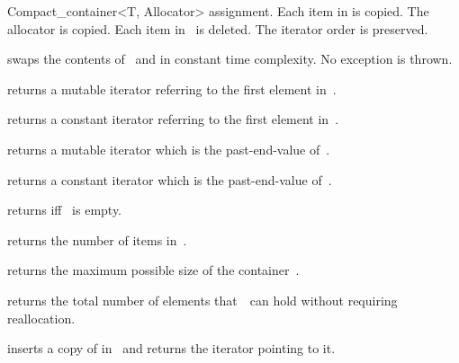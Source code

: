 \begin{ccRefClass}{Compact_container<T, Allocator>}
  {assignment. Each item in  is copied.  The allocator is copied.
   Each item in \ccVar\ is deleted.  The iterator order is preserved.}

  {swaps the contents of \ccVar\ and  in constant time
   complexity.  No exception is thrown.}


  \def\ccTagRmTrailingConst{\ccFalse}
  {returns a mutable iterator referring to the first element in~\ccVar.}

  \ccGlue{}
  {returns a constant iterator referring to the first element in~\ccVar.}

  \ccGlue{}
  {returns a mutable iterator which is the past-end-value of~\ccVar.}

  \ccGlue{}
  {returns a constant iterator which is the past-end-value of~\ccVar.}

  \ccGlue{}
  \ccGlue{}
  \ccGlue{}
  \def\ccTagRmTrailingConst{\ccTrue}

  {returns  iff \ccVar\ is empty.}

  \ccGlue{}
  {returns the number of items in~\ccVar.}

  \ccGlue{}
  {returns the maximum possible size of the container~\ccVar.}

  \ccGlue{}
  {returns the total number of elements that~\ccVar\ can hold without requiring
   reallocation.}




  {inserts a copy of  in \ccVar\ and returns the iterator pointing
   to it.}


\end{ccRefClass}
